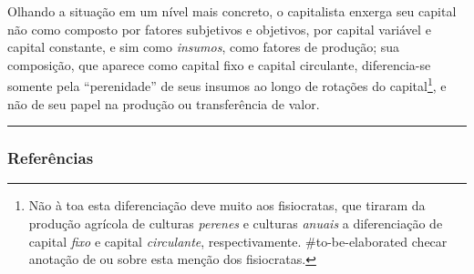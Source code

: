\documentclass[12pt]{article}
\numberwithin{equation}{section}
\theoremstyle{plain}
\theoremstyle{definition}
\theoremstyle{remark}
\begin{document}
Olhando a situação em um nível mais concreto, o capitalista enxerga seu capital não como composto por fatores subjetivos e objetivos, por capital variável e capital constante, e sim como \textit{insumos}, como fatores de produção; sua composição, que aparece como capital fixo e capital circulante, diferencia-se somente pela ``perenidade'' de seus insumos ao longo de rotações do capital\footnote{Não à toa esta diferenciação deve muito aos fisiocratas, que tiraram da produção agrícola de culturas \textit{perenes} e culturas \textit{anuais} a diferenciação de capital \textit{fixo} e capital \textit{circulante}, respectivamente. \#to-be-elaborated checar anotação de \textcite{Marx2014} ou \textcite{Marx2017a} sobre esta menção dos fisiocratas.}, e não de seu papel na produção ou transferência de valor.

\begin{center}\rule{0.5\linewidth}{0.5pt}\end{center}

\hypertarget{referuxeancias}{%
\subsubsection{Referências}\label{referuxeancias}}

\printbibliography
\end{document}
